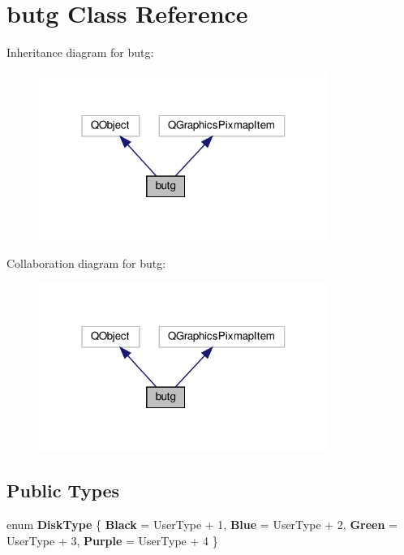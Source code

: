 \hypertarget{classbutg}{}\section{butg Class Reference}
\label{classbutg}


Inheritance diagram for butg\+:
\nopagebreak
\begin{figure}[H]
\begin{center}
\leavevmode
\includegraphics[width=268pt]{classbutg__inherit__graph}
\end{center}
\end{figure}


Collaboration diagram for butg\+:
\nopagebreak
\begin{figure}[H]
\begin{center}
\leavevmode
\includegraphics[width=268pt]{classbutg__coll__graph}
\end{center}
\end{figure}
\subsection*{Public Types}
\begin{DoxyCompactItemize}
\item 
\mbox{\label{classbutg_adff525298cdca0bcfa0929c361f6600d}} 
enum {\bfseries Disk\+Type} \{ {\bfseries Black} = User\+Type + 1, 
{\bfseries Blue} = User\+Type + 2, 
{\bfseries Green} = User\+Type + 3, 
{\bfseries Purple} = User\+Type + 4
 \}
\end{DoxyCompactItemize}
